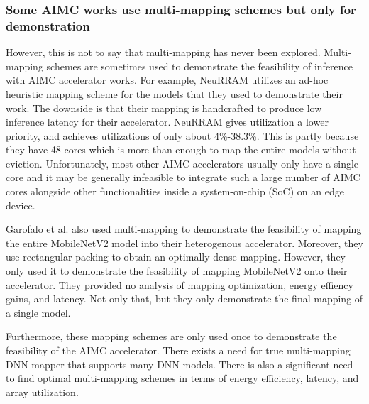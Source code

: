 \subsubsection{Some AIMC works use multi-mapping schemes but only for demonstration}

However, this is not to say that multi-mapping has never been explored. Multi-mapping schemes are sometimes used to demonstrate the feasibility of inference with AIMC accelerator works. For example, NeuRRAM \cite{wanneurram} utilizes an ad-hoc heuristic mapping scheme for the models that they used to demonstrate their work. The downside is that their mapping is handcrafted to produce low inference latency for their accelerator. NeuRRAM gives utilization a lower priority, and achieves utilizations of only about 4\%-38.3\%. This is partly because they have 48 cores which is more than enough to map the entire models without eviction. Unfortunately, most other AIMC accelerators usually only have a single core and it may be generally infeasible to integrate such a large number of AIMC cores alongside other functionalities inside a system-on-chip (SoC) on an edge device.

Garofalo et al. \cite{garofalo2022heterogeneous} also used multi-mapping to demonstrate the feasibility of mapping the entire MobileNetV2 model into their heterogenous accelerator. Moreover, they use rectangular packing to obtain an optimally dense mapping. However, they only used it to demonstrate the feasibility of mapping MobileNetV2 onto their accelerator. They provided no analysis of mapping optimization, energy effiency gains, and latency. Not only that, but they only demonstrate the final mapping of a single model.

Furthermore, these mapping schemes are only used once to demonstrate the feasibility of the AIMC accelerator. There exists a need for true multi-mapping DNN mapper that supports many DNN models. There is also a significant need to find optimal multi-mapping schemes in terms of energy efficiency, latency, and array utilization.